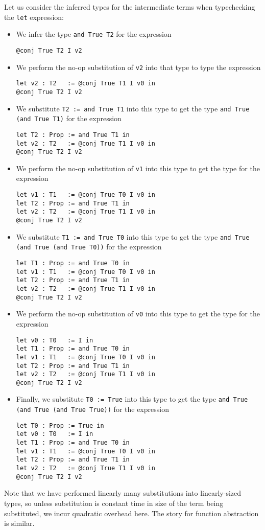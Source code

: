 Let us consider the inferred types for the intermediate terms when typechecking the \texttt{let} expression:
\begin{itemize}
  \item
  We infer the type \texttt{and True T2} for the expression
\begin{verbatim}
@conj True T2 I v2
\end{verbatim}
  \item
  We perform the no-op substitution of \texttt{v2} into that type to type the expression
\begin{verbatim}
let v2 : T2   := @conj True T1 I v0 in
@conj True T2 I v2
\end{verbatim}
  \item
  We substitute \texttt{T2 := and True T1} into this type to get the type \texttt{and True (and True T1)} for the expression
\begin{verbatim}
let T2 : Prop := and True T1 in
let v2 : T2   := @conj True T1 I v0 in
@conj True T2 I v2
\end{verbatim}
  \item
  We perform the no-op substitution of \texttt{v1} into this type to get the type for the expression
\begin{verbatim}
let v1 : T1   := @conj True T0 I v0 in
let T2 : Prop := and True T1 in
let v2 : T2   := @conj True T1 I v0 in
@conj True T2 I v2
\end{verbatim}
  \item
  We substitute \texttt{T1 := and True T0} into this type to get the type \texttt{and True (and True (and True T0))} for the expression
\begin{verbatim}
let T1 : Prop := and True T0 in
let v1 : T1   := @conj True T0 I v0 in
let T2 : Prop := and True T1 in
let v2 : T2   := @conj True T1 I v0 in
@conj True T2 I v2
\end{verbatim}
  \item
  We perform the no-op substitution of \texttt{v0} into this type to get the type for the expression
\begin{verbatim}
let v0 : T0   := I in
let T1 : Prop := and True T0 in
let v1 : T1   := @conj True T0 I v0 in
let T2 : Prop := and True T1 in
let v2 : T2   := @conj True T1 I v0 in
@conj True T2 I v2
\end{verbatim}
  \item
  Finally, we substitute \texttt{T0 := True} into this type to get the type \texttt{and True (and True (and True True))} for the expression
\begin{verbatim}
let T0 : Prop := True in
let v0 : T0   := I in
let T1 : Prop := and True T0 in
let v1 : T1   := @conj True T0 I v0 in
let T2 : Prop := and True T1 in
let v2 : T2   := @conj True T1 I v0 in
@conj True T2 I v2
\end{verbatim}
\end{itemize}
Note that we have performed linearly many substitutions into linearly-sized types, so unless substitution is constant time in size of the term being substituted, we incur quadratic overhead here.
The story for function abstraction is similar.

